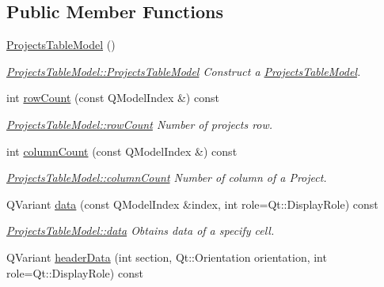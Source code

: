 \subsection*{Public Member Functions}
\begin{DoxyCompactItemize}
\item 
\hyperlink{classGui_1_1Widgets_1_1WdgModels_1_1ProjectsTableModel_a4e0841b0ef99ec466d9660c39528925a}{Projects\+Table\+Model} ()
\begin{DoxyCompactList}\small\item\em \hyperlink{classGui_1_1Widgets_1_1WdgModels_1_1ProjectsTableModel_a4e0841b0ef99ec466d9660c39528925a}{Projects\+Table\+Model\+::\+Projects\+Table\+Model} Construct a \hyperlink{classGui_1_1Widgets_1_1WdgModels_1_1ProjectsTableModel}{Projects\+Table\+Model}. \end{DoxyCompactList}\item 
int \hyperlink{classGui_1_1Widgets_1_1WdgModels_1_1ProjectsTableModel_aeb603c6cedf81682234f705c4e51c4d5}{row\+Count} (const Q\+Model\+Index \&) const 
\begin{DoxyCompactList}\small\item\em \hyperlink{classGui_1_1Widgets_1_1WdgModels_1_1ProjectsTableModel_aeb603c6cedf81682234f705c4e51c4d5}{Projects\+Table\+Model\+::row\+Count} Number of projects row. \end{DoxyCompactList}\item 
int \hyperlink{classGui_1_1Widgets_1_1WdgModels_1_1ProjectsTableModel_a02d2308cf2a4894d57b12e4ab3886c29}{column\+Count} (const Q\+Model\+Index \&) const 
\begin{DoxyCompactList}\small\item\em \hyperlink{classGui_1_1Widgets_1_1WdgModels_1_1ProjectsTableModel_a02d2308cf2a4894d57b12e4ab3886c29}{Projects\+Table\+Model\+::column\+Count} Number of column of a Project. \end{DoxyCompactList}\item 
Q\+Variant \hyperlink{classGui_1_1Widgets_1_1WdgModels_1_1ProjectsTableModel_aca598260b807060a5d89f09430d6bd1d}{data} (const Q\+Model\+Index \&index, int role=Qt\+::\+Display\+Role) const 
\begin{DoxyCompactList}\small\item\em \hyperlink{classGui_1_1Widgets_1_1WdgModels_1_1ProjectsTableModel_aca598260b807060a5d89f09430d6bd1d}{Projects\+Table\+Model\+::data} Obtains data of a specify cell. \end{DoxyCompactList}\item 
Q\+Variant \hyperlink{classGui_1_1Widgets_1_1WdgModels_1_1ProjectsTableModel_ad984702eada2770507a1507ea9e3e685}{header\+Data} (int section, Qt\+::\+Orientation orientation, int role=Qt\+::\+Display\+Role) const 

\end{DoxyCompactItemize}
